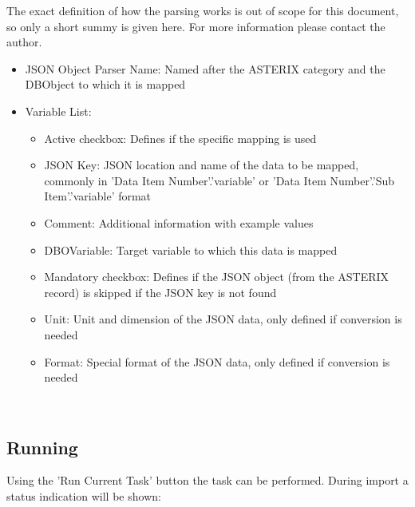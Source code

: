 The exact definition of how the parsing works is out of scope for this document, so only a short summy is given here. For more information please contact the author.


\begin{itemize}  
\item JSON Object Parser Name: Named after the ASTERIX category and the DBObject to which it is mapped
\item Variable List:
\begin{itemize}  
\item Active checkbox: Defines if the specific mapping is used
\item JSON Key: JSON location and name of the data to be mapped, commonly in 'Data Item Number'.'variable' or 'Data Item Number'.'Sub Item'.'variable' format
\item Comment: Additional information with example values
\item DBOVariable: Target variable to which this data is mapped
\item Mandatory checkbox: Defines if the JSON object (from the ASTERIX record) is skipped if the JSON key is not found
\item Unit: Unit and dimension of the JSON data, only defined if conversion is needed
\item Format: Special format of the JSON data, only defined if conversion is needed
\end{itemize}
\end{itemize}
\ \\

\subsection{Running}

Using the 'Run Current Task' button the task can be performed. During import a status indication will be shown:

